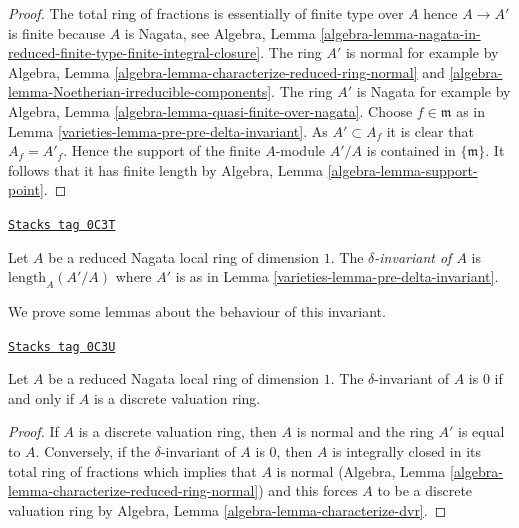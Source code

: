 \begin{proof}

The total ring of fractions is essentially of finite type over $A$
hence $A \to A'$ is finite because $A$ is Nagata, see Algebra, Lemma
\ref{algebra-lemma-nagata-in-reduced-finite-type-finite-integral-closure}.
The ring $A'$ is normal for example by
Algebra, Lemma \ref{algebra-lemma-characterize-reduced-ring-normal} and
\ref{algebra-lemma-Noetherian-irreducible-components}.
The ring $A'$ is Nagata for example by
Algebra, Lemma \ref{algebra-lemma-quasi-finite-over-nagata}.
Choose $f \in \mathfrak m$ as in Lemma \ref{varieties-lemma-pre-pre-delta-invariant}.
As $A' \subset A_f$ it is clear that $A_f = A'_f$. Hence the support of the
finite $A$-module $A'/A$ is contained in $\{\mathfrak m\}$.
It follows that it has finite length by
Algebra, Lemma \ref{algebra-lemma-support-point}.
\end{proof}

\begin{definition}
\label{varieties-definition-delta-invariant-algebra}
\href{https://stacks.math.columbia.edu/tag/0C3T}{\texttt{Stacks tag 0C3T}}

Let $A$ be a reduced Nagata local ring of dimension $1$.
The {\it $\delta$-invariant of $A$} is $\text{length}_A(A'/A)$
where $A'$ is as in Lemma \ref{varieties-lemma-pre-delta-invariant}.
\end{definition}

We prove some lemmas about the behaviour of this invariant.

\begin{lemma}
\label{varieties-lemma-delta-invariant-is-zero}
\href{https://stacks.math.columbia.edu/tag/0C3U}{\texttt{Stacks tag 0C3U}}

Let $A$ be a reduced Nagata local ring of dimension $1$.
The $\delta$-invariant of $A$ is $0$ if and only if
$A$ is a discrete valuation ring.
\end{lemma}

\begin{proof}
If $A$ is a discrete valuation ring, then $A$ is normal and
the ring $A'$ is equal to $A$. Conversely, if the
$\delta$-invariant of $A$ is $0$, then $A$ is integrally
closed in its total ring of fractions which implies that
$A$ is normal
(Algebra, Lemma \ref{algebra-lemma-characterize-reduced-ring-normal})
and this forces $A$ to be a discrete valuation ring by
Algebra, Lemma \ref{algebra-lemma-characterize-dvr}.
\end{proof}

